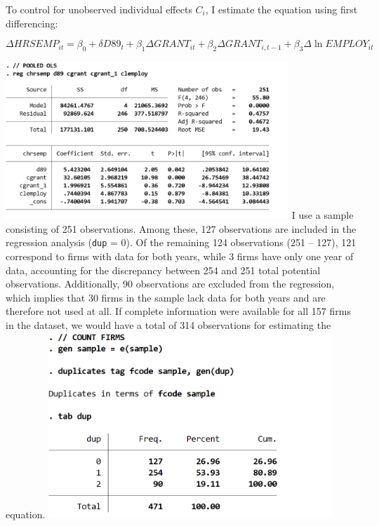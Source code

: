 \documentclass{article}
\begin{document}
\noindent
To control for unobserved individual effects \(C_i\), I estimate the equation using first differencing:

\begin{equation}
\Delta HRSEMP_{it} = \beta_0 + \delta D89_t + \beta_1 \Delta GRANT_{it} + \beta_2 \Delta GRANT_{i,t-1} + \beta_3 \Delta \ln EMPLOY_{it}
\end{equation}

\begin{center}
    
    \includegraphics[width=0.8\textwidth]{HW4/P3-1.jpg}
    I use a sample consisting of 251 observations. Among these, 127 observations are included in the regression analysis (\texttt{dup} = 0). Of the remaining 124 observations (251 -- 127), 121 correspond to firms with data for both years, while 3 firms have only one year of data, accounting for the discrepancy between 254 and 251 total potential observations. Additionally, 90 observations are excluded from the regression, which implies that 30 firms in the sample lack data for both years and are therefore not used at all. If complete information were available for all 157 firms in the dataset, we would have a total of 314 observations for estimating the equation.
    \includegraphics[width=0.8\textwidth]{HW4/P3-2.jpg}


\end{center}
\end{document}
